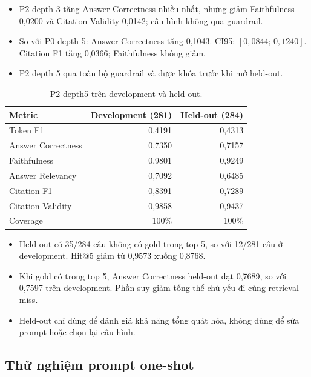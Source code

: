 \begin{itemize}
  \item P2 depth 3 tăng Answer Correctness nhiều nhất, nhưng giảm Faithfulness
  0,0200 và Citation Validity 0,0142; cấu hình không qua guardrail.
  \item So với P0 depth 5: Answer Correctness tăng 0,1043.
  CI95: $[0,0844;\,0,1240]$. Citation F1 tăng 0,0366; Faithfulness không giảm.
  \item P2 depth 5 qua toàn bộ guardrail và được khóa trước khi mở held-out.
\end{itemize}

\begin{table}[H]
  \centering
  \caption{P2-depth5 trên development và held-out.}
  \label{tab:phase2-zero-shot-heldout}
  \small
  \begin{tabular}{lrr}
    \toprule
    \textbf{Metric} & \textbf{Development (281)} & \textbf{Held-out (284)} \\
    \midrule
    Token F1 & 0,4191 & 0,4313 \\
    Answer Correctness & 0,7350 & 0,7157 \\
    Faithfulness & 0,9801 & 0,9249 \\
    Answer Relevancy & 0,7092 & 0,6485 \\
    Citation F1 & 0,8391 & 0,7289 \\
    Citation Validity & 0,9858 & 0,9437 \\
    Coverage & 100\% & 100\% \\
    \bottomrule
  \end{tabular}
\end{table}

\begin{itemize}
  \item Held-out có 35/284 câu không có gold trong top 5, so với 12/281 câu ở
  development. Hit@5 giảm từ 0,9573 xuống 0,8768.
  \item Khi gold có trong top 5, Answer Correctness held-out đạt 0,7689, so với
  0,7597 trên development. Phần suy giảm tổng thể chủ yếu đi cùng retrieval miss.
  \item Held-out chỉ dùng để đánh giá khả năng tổng quát hóa, không dùng để sửa
  prompt hoặc chọn lại cấu hình.
\end{itemize}

\subsection{Thử nghiệm prompt one-shot}

